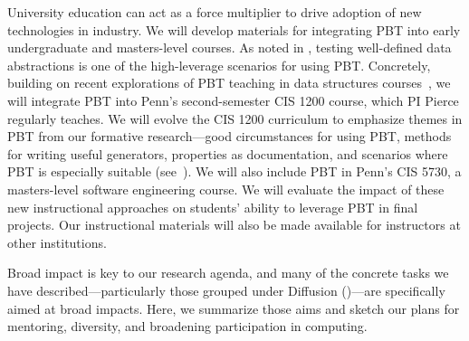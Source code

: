 {
%
University education can act as a force
multiplier to drive adoption of new
technologies in industry.
We will develop materials for
integrating PBT into early undergraduate and masters-level courses. As
noted in , testing well-defined data
abstractions is one of the high-leverage scenarios for using PBT.
%
Concretely, building on
recent explorations of PBT teaching in data structures
courses~\cite{wrenn2021using, nelson2021automated}, we will integrate PBT into
Penn's second-semester CIS 1200 course, which PI Pierce regularly teaches.
%
We
will evolve the CIS 1200 curriculum to emphasize themes in PBT from our
formative research---good circumstances for
using PBT, methods for writing useful generators, properties as
documentation, and scenarios where PBT is especially suitable
(see~).
%
We will also include PBT in Penn's CIS 5730, a masters-level software
engineering course.
%
We will evaluate the impact of these new
instructional approaches on students' ability to leverage PBT in final
projects.
%
Our instructional materials will also be made available for
instructors at other institutions.


\immediate\closeout\workplanfile






Broad impact is key to our research agenda, and many of the concrete
tasks we have described---particularly those grouped under Diffusion
()---are specifically aimed at broad
impacts.  Here, we summarize those aims and sketch our plans for
mentoring, diversity, and broadening participation in computing.

}
